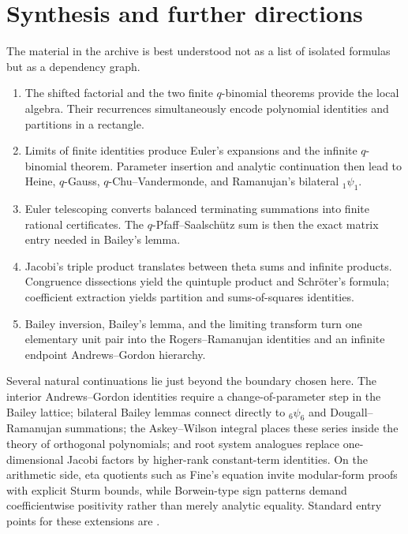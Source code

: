 \documentclass[11pt,oneside]{article}
\theoremstyle{definition}
\begin{document}
\section{Synthesis and further directions}
\label{sec:synthesis}

The material in the archive is best understood not as a list of isolated
formulas but as a dependency graph.

\begin{enumerate}[label=\arabic*.]
\item The shifted factorial and the two finite $q$-binomial theorems provide
      the local algebra.  Their recurrences simultaneously encode polynomial
      identities and partitions in a rectangle.
\item Limits of finite identities produce Euler's expansions and the infinite
      $q$-binomial theorem.  Parameter insertion and analytic continuation
      then lead to Heine, $q$-Gauss, $q$-Chu--Vandermonde, and Ramanujan's
      bilateral ${}_1\psi_1$.
\item Euler telescoping converts balanced terminating summations into finite
      rational certificates.  The $q$-Pfaff--Saalsch\"utz sum is then the
      exact matrix entry needed in Bailey's lemma.
\item Jacobi's triple product translates between theta sums and infinite
      products.  Congruence dissections yield the quintuple product and
      Schr\"oter's formula; coefficient extraction yields partition and
      sums-of-squares identities.
\item Bailey inversion, Bailey's lemma, and the limiting transform turn one
      elementary unit pair into the Rogers--Ramanujan identities and an
      infinite endpoint Andrews--Gordon hierarchy.
\end{enumerate}

Several natural continuations lie just beyond the boundary chosen here.
The interior Andrews--Gordon identities require a change-of-parameter step in
the Bailey lattice; bilateral Bailey lemmas connect directly to
${}_6\psi_6$ and Dougall--Ramanujan summations; the Askey--Wilson integral
places these series inside the theory of orthogonal polynomials; and root
system analogues replace one-dimensional Jacobi factors by higher-rank
constant-term identities.  On the arithmetic side, eta quotients such as
Fine's equation invite modular-form proofs with explicit Sturm bounds, while
Borwein-type sign patterns demand coefficientwise positivity rather than
merely analytic equality.  Standard entry points for these extensions are
\cite{Andrews1986,GasperRahman,AndrewsAskeyRoy,DLMF17}.
\end{document}
